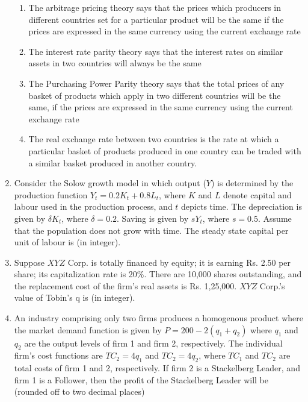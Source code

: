 \documentclass{article}
\begin{document}
\begin{enumerate}[leftmargin=*, start=45, label=Q.\arabic*.]
    \begin{enumerate}
        \item The arbitrage pricing theory says that the prices which producers in different countries set for a particular product will be the same if the prices are expressed in the same currency using the current exchange rate
        \item The interest rate parity theory says that the interest rates on similar assets in two countries will always be the same
        \item The Purchasing Power Parity theory says that the total prices of any basket of products which apply in two different countries will be the same, if the prices are expressed in the same currency using the current exchange rate
        \item The real exchange rate between two countries is the rate at which a particular basket of products produced in one country can be traded with a similar basket produced in another country.
    \end{enumerate}

    \item Consider the Solow growth model in which output ($Y$) is determined by the production function $Y_t=0.2K_t+0.8L_t$, where $K$ and $L$ denote capital and labour used in the production process, and $t$ depicts time. The depreciation is given by $\delta K_t$, where $\delta=0.2$. Saving is given by $sY_t$, where $s=0.5$. Assume that the population does not grow with time. The steady state capital per unit of labour is \makebox[1cm]{\hrulefill} (in integer).

    \item Suppose $XYZ$ Corp. is totally financed by equity; it is earning Rs. 2.50 per share; its capitalization rate is 20\%. There are 10,000 shares outstanding, and the replacement cost of the firm’s real assets is Rs. 1,25,000. $XYZ$ Corp.’s value of Tobin’s q is \makebox[1cm]{\hrulefill} (in integer). 

    \item An industry comprising only two firms produces a homogenous product where the market demand function is given by $P=200-2(q_1+q_2)$ where $q_1$ and $q_2$ are the output levels of firm 1 and firm 2, respectively. The individual firm’s cost functions are $TC_2=4q_1$ and $TC_2=4q_2$, where $TC_1$ and $TC_2$ are total costs of firm 1 and 2, respectively. If firm 2 is a Stackelberg Leader, and firm 1 is a Follower, then the profit of the Stackelberg Leader will be \makebox[1cm]{\hrulefill} (rounded off to two decimal places)


\end{enumerate}
\end{document}
